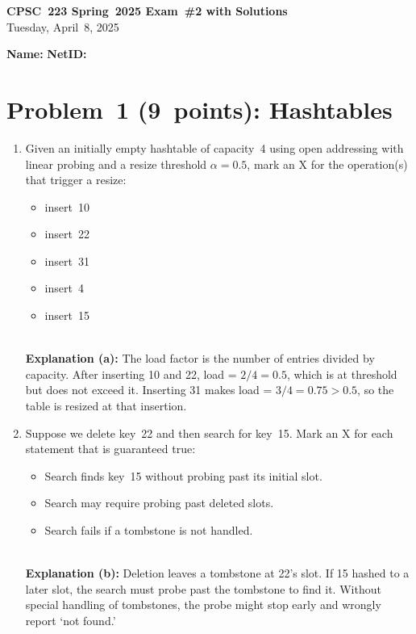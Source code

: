 \documentclass[12pt]{article}
\begin{document}
\begin{center}
  \textbf{CPSC 223 Spring 2025 Exam \#2 with Solutions}\\
  Tuesday, April 8, 2025
\end{center}

\vspace{1em}
\noindent
\textbf{Name:} \underline{\hspace{3in}}
\quad
\textbf{NetID:} \underline{\hspace{2in}}

\vspace{1em}

\section*{Problem 1 (9 points): Hashtables}
\begin{enumerate}[label=\alph*)]
  \item Given an initially empty hashtable of capacity 4 using open addressing with linear probing and a resize threshold \(\alpha=0.5\), mark an X for the operation(s) that trigger a resize:
    \begin{itemize}
      \item[\ ] insert 10
      \item[\ ] insert 22
      \item[X] insert 31
      \item[\ ] insert 4
      \item[\ ] insert 15
    \end{itemize}
    \\
    \textbf{Explanation (a):}  
    The load factor is the number of entries divided by capacity. After inserting 10 and 22, load = \(2/4 = 0.5\), which is at threshold but does not exceed it. Inserting 31 makes load = \(3/4 = 0.75 > 0.5\), so the table is resized at that insertion.

  \item Suppose we delete key 22 and then search for key 15.  Mark an X for each statement that is guaranteed true:
    \begin{itemize}
      \item[\ ] Search finds key 15 without probing past its initial slot.
      \item[X] Search may require probing past deleted slots.
      \item[X] Search fails if a tombstone is not handled.
    \end{itemize}
    \\
    \textbf{Explanation (b):}  
    Deletion leaves a tombstone at 22’s slot. If 15 hashed to a later slot, the search must probe past the tombstone to find it. Without special handling of tombstones, the probe might stop early and wrongly report ‘not found.’


\end{enumerate}
\end{document}
